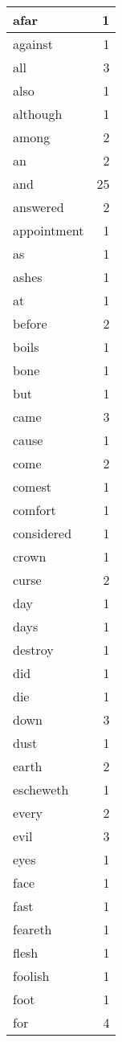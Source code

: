 \begin{center}
\begin{longtable}{l|r}
afar & 1\\ \hline 
against & 1\\ \hline 
all & 3\\ \hline 
also & 1\\ \hline 
although & 1\\ \hline 
among & 2\\ \hline 
an & 2\\ \hline 
and & 25\\ \hline 
answered & 2\\ \hline 
appointment & 1\\ \hline 
as & 1\\ \hline 
ashes & 1\\ \hline 
at & 1\\ \hline 
before & 2\\ \hline 
boils & 1\\ \hline 
bone & 1\\ \hline 
but & 1\\ \hline 
came & 3\\ \hline 
cause & 1\\ \hline 
come & 2\\ \hline 
comest & 1\\ \hline 
comfort & 1\\ \hline 
considered & 1\\ \hline 
crown & 1\\ \hline 
curse & 2\\ \hline 
day & 1\\ \hline 
days & 1\\ \hline 
destroy & 1\\ \hline 
did & 1\\ \hline 
die & 1\\ \hline 
down & 3\\ \hline 
dust & 1\\ \hline 
earth & 2\\ \hline 
escheweth & 1\\ \hline 
every & 2\\ \hline 
evil & 3\\ \hline 
eyes & 1\\ \hline 
face & 1\\ \hline 
fast & 1\\ \hline 
feareth & 1\\ \hline 
flesh & 1\\ \hline 
foolish & 1\\ \hline 
foot & 1\\ \hline 
for & 4\\ \hline 

\end{longtable}
\end{center}
